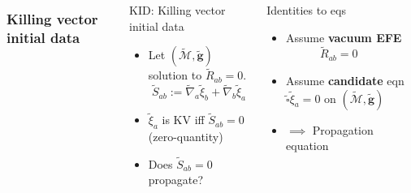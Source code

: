 \documentclass[10pt]{beamer}
\theoremstyle{plain}
\def\bmg{{\bm g}}
\begin{document}









\begin{frame}
\begin{columns}
\column{6.5cm}
\frametitle{Killing vector initial data}
\vspace{-5mm}
\begin{exampleblock}{KID: Killing vector initial data }
  \begin{itemize}
  \item Let $(\tilde{\mathcal{M}},\tilde{\bmg})$ solution to $\tilde{R}_{ab}=0$.
    \[\tilde{S}_{ab} := \tilde{\nabla}_{a}\tilde{\xi}_{b}+\tilde{\nabla}_{b}\tilde{\xi}_{a}\]
    \vspace{-5mm}
  \item $\tilde{\xi}_{a}$ is KV iff $\tilde{S}_{ab}=0$ (zero-quantity)
  \item Does $\tilde{S}_{ab}=0$ propagate?
  \end{itemize}
\end{exampleblock}
\vspace{-2mm}
\column{5.3cm}
\vspace{-5mm}
\begin{block}{Identities to eqs}
  \begin{itemize}
   \item Assume \textbf{vacuum EFE} $\qquad \quad \tilde{R}_{ab}=0$
   \item Assume \textbf{candidate} eqn $\tilde{\square}\tilde{\xi}_a=0$ on $(\tilde{\mathcal{M}},\tilde{\bmg})$
   \item  $\implies$ Propagation equation
     \vspace{-2mm}
     \[
\]
\end{itemize}
\end{block}
\end{columns}
\end{frame}
\end{document}
